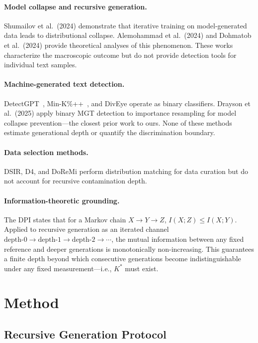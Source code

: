 \documentclass[11pt,a4paper]{article}
\newcommand{\kstar}{K^{*}}
\begin{document}
\paragraph{Model collapse and recursive generation.}
Shumailov et al.\ (2024) demonstrate that iterative training on model-generated data leads to distributional collapse.
Alemohammad et al.\ (2024) and Dohmatob et al.\ (2024) provide theoretical analyses of this phenomenon.
These works characterize the macroscopic outcome but do not provide detection tools for individual text samples.

\paragraph{Machine-generated text detection.}
DetectGPT~\cite{mitchell2023detectgpt}, Min-K\%++~\cite{hans2024spotting}, and DivEye operate as binary classifiers.
Drayson et al.\ (2025) apply binary MGT detection to importance resampling for model collapse prevention---the closest prior work to ours.
None of these methods estimate generational depth or quantify the discrimination boundary.

\paragraph{Data selection methods.}
DSIR, D4, and DoReMi perform distribution matching for data curation but do not account for recursive contamination depth.

\paragraph{Information-theoretic grounding.}
The DPI states that for a Markov chain $X \to Y \to Z$, $I(X; Z) \leq I(X; Y)$.
Applied to recursive generation as an iterated channel $\text{depth-}0 \to \text{depth-}1 \to \text{depth-}2 \to \cdots$, the mutual information between any fixed reference and deeper generations is monotonically non-increasing.
This guarantees a finite depth beyond which consecutive generations become indistinguishable under any fixed measurement---i.e., $\kstar$ must exist.

\section{Method}
\label{sec:method}

\subsection{Recursive Generation Protocol}
\label{sec:gen_protocol}
\end{document}
